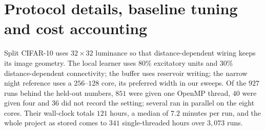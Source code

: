\documentclass{article}
\begin{document}
\section{Protocol details, baseline tuning and cost accounting}
\label{app:cost}
Split CIFAR-10 uses $32{\times}32$ luminance so that distance-dependent wiring keeps its
image geometry. The local learner uses $80\%$ excitatory units and $30\%$ distance-dependent
connectivity; the buffer uses reservoir writing; the narrow night reference uses a
$256$--$128$ core, its preferred width in our sweeps. Of the $927$ runs behind the held-out
numbers, $851$ were given one OpenMP thread, $40$ were given four and $36$ did not record
the setting; several ran in parallel on the eight cores. Their wall-clock totals $121$
hours, a median of $7.2$ minutes per run, and the whole project as stored comes to $341$
single-threaded hours over $3{,}073$ runs.
\end{document}
